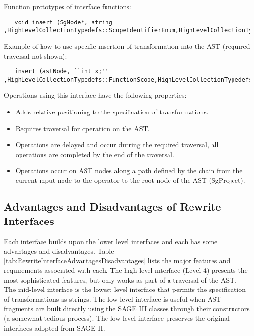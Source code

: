 Function prototypes of interface functions:
{\indent
{\mySmallFontSize
\begin{verbatim}
   void insert (SgNode*, string ,HighLevelCollectionTypedefs::ScopeIdentifierEnum,HighLevelCollectionTypedefs::PlacementPositionEnum);
\end{verbatim}
}}
Example of how to use specific insertion of transformation into the AST (required traversal not shown):
{\indent
{\mySmallFontSize
\begin{verbatim}
   insert (astNode, ``int x;'' ,HighLevelCollectionTypedefs::FunctionScope,HighLevelCollectionTypedefs::TopOfScope);
\end{verbatim}
}}
Operations using this interface have the following properties:
\begin{itemize}
   \item Adds relative positioning to the specification of transformations.
   \item Requires traversal for operation on the AST.
   \item Operations are delayed and occur durring the required traversal, all operations
    are completed by the end of the traversal.
   \item Operations occur on AST nodes along a path defined by the chain from the current
    input node to the operator to the root node of the AST (SgProject).
\end{itemize}



\subsection{Advantages and Disadvantages of Rewrite Interfaces}

   Each interface builds upon the lower level interfaces and each 
has some advantages and disadvantages. Table 
\ref{tab:RewriteInterfaceAdvantagesDisadvantages} lists the
major features and requirements associated with each.  The
high-level interface (Level 4) presents the most sophisticated 
features, but only works as part of a traversal of the AST.  The 
mid-level interface is the lowest level interface that permits 
the specification of transformations as strings.  The low-level interface
is useful when AST fragments are built directly using the SAGE III
classes through their constructors (a somewhat tedious process).
The low level interface preserves the original interfaces adopted 
from SAGE II.


